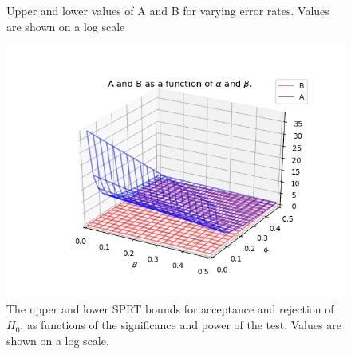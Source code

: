 \begin{figure}%
    \centering
    \qquad
    \caption{Upper and lower values of A and B for varying error rates. Values are shown on a log scale}%
    \label{fig:example}%
\end{figure}



\begin{figure}
    \centering
    \includegraphics[width = 0.75\linewidth]{Chapters/MultiAgentTargetDetection/Figs/SearchTermination/AandBAsFunctionOfAlphaAndBeta.png}
    \caption{The upper and lower SPRT bounds for acceptance and rejection of $H_0$, as functions of the significance and power of the test. Values are shown on a log scale.}
    \label{fig:SPRTCutoffFunctionOfAlphaAndBeta}
\end{figure}



